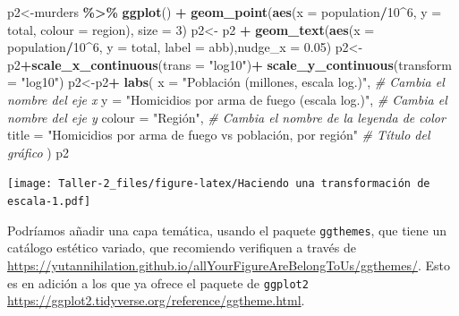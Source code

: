 \documentclass[
]{article}
\newenvironment{Shaded}{\begin{snugshade}}{\end{snugshade}}
\newcommand{\AttributeTok}[1]{\textcolor[rgb]{0.13,0.29,0.53}{#1}}
\newcommand{\CommentTok}[1]{\textcolor[rgb]{0.56,0.35,0.01}{\textit{#1}}}
\newcommand{\DecValTok}[1]{\textcolor[rgb]{0.00,0.00,0.81}{#1}}
\newcommand{\FloatTok}[1]{\textcolor[rgb]{0.00,0.00,0.81}{#1}}
\newcommand{\FunctionTok}[1]{\textcolor[rgb]{0.13,0.29,0.53}{\textbf{#1}}}
\newcommand{\NormalTok}[1]{#1}
\newcommand{\OtherTok}[1]{\textcolor[rgb]{0.56,0.35,0.01}{#1}}
\newcommand{\SpecialCharTok}[1]{\textcolor[rgb]{0.81,0.36,0.00}{\textbf{#1}}}
\newcommand{\StringTok}[1]{\textcolor[rgb]{0.31,0.60,0.02}{#1}}
\begin{document}
\begin{Shaded}
\begin{Highlighting}[]
\NormalTok{p2}\OtherTok{\textless{}{-}}\NormalTok{murders }\SpecialCharTok{\%\textgreater{}\%}
  \FunctionTok{ggplot}\NormalTok{() }\SpecialCharTok{+}
  \FunctionTok{geom\_point}\NormalTok{(}\FunctionTok{aes}\NormalTok{(}\AttributeTok{x =}\NormalTok{ population}\SpecialCharTok{/}\DecValTok{10}\SpecialCharTok{\^{}}\DecValTok{6}\NormalTok{, }\AttributeTok{y =}\NormalTok{ total, }\AttributeTok{colour =}\NormalTok{ region), }\AttributeTok{size =} \DecValTok{3}\NormalTok{)}
\NormalTok{p2}\OtherTok{\textless{}{-}}\NormalTok{ p2 }\SpecialCharTok{+} \FunctionTok{geom\_text}\NormalTok{(}\FunctionTok{aes}\NormalTok{(}\AttributeTok{x =}\NormalTok{ population}\SpecialCharTok{/}\DecValTok{10}\SpecialCharTok{\^{}}\DecValTok{6}\NormalTok{, }\AttributeTok{y =}\NormalTok{ total, }\AttributeTok{label =}\NormalTok{ abb),}\AttributeTok{nudge\_x =} \FloatTok{0.05}\NormalTok{)}
\NormalTok{p2}\OtherTok{\textless{}{-}}\NormalTok{p2}\SpecialCharTok{+}\FunctionTok{scale\_x\_continuous}\NormalTok{(}\AttributeTok{trans =} \StringTok{"log10"}\NormalTok{)}\SpecialCharTok{+}
  \FunctionTok{scale\_y\_continuous}\NormalTok{(}\AttributeTok{transform =} \StringTok{"log10"}\NormalTok{)}
\NormalTok{p2}\OtherTok{\textless{}{-}}\NormalTok{p2}\SpecialCharTok{+}
  \FunctionTok{labs}\NormalTok{(}
    \AttributeTok{x =} \StringTok{"Población (millones, escala log.)"}\NormalTok{,   }\CommentTok{\# Cambia el nombre del eje x}
    \AttributeTok{y =} \StringTok{"Homicidios por arma de fuego (escala log.)"}\NormalTok{,            }\CommentTok{\# Cambia el nombre del eje y}
    \AttributeTok{colour =} \StringTok{"Región"}\NormalTok{,              }\CommentTok{\# Cambia el nombre de la leyenda de color}
    \AttributeTok{title =} \StringTok{"Homicidios por arma de fuego vs población, por región"}  \CommentTok{\# Título del gráfico}
\NormalTok{  )}
\NormalTok{p2}
\end{Highlighting}
\end{Shaded}

\texttt{[image: Taller-2\_files/figure-latex/Haciendo una transformación de escala-1.pdf]}

Podríamos añadir una capa temática, usando el paquete \texttt{ggthemes},
que tiene un catálogo estético variado, que recomiendo verifiquen a
través de
\url{https://yutannihilation.github.io/allYourFigureAreBelongToUs/ggthemes/}.
Esto es en adición a los que ya ofrece el paquete de \texttt{ggplot2}
\url{https://ggplot2.tidyverse.org/reference/ggtheme.html}.
\end{document}
